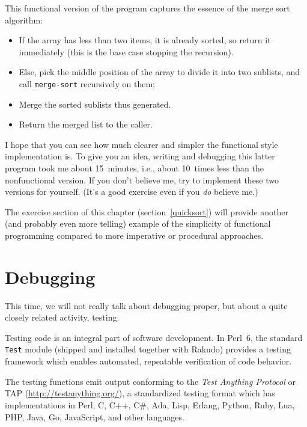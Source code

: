 This functional version of the program captures  
the essence of the merge sort algorithm:
\begin{itemize}
\item If the  array has less than two items, it is already 
sorted, so return it immediately (this is the base case 
stopping the recursion).
\item Else, pick the middle position of the array to divide 
it into two sublists, and call \verb'merge-sort' recursively 
on them;
\item Merge the sorted sublists thus generated.
\item Return the merged list to the caller.
\end{itemize}

I hope that you can see how much clearer and simpler the 
functional style implementation is. To give you an idea, 
writing and debugging this latter program took me about 
15~minutes, i.e., about 10~times less than the 
nonfunctional version. If you don't believe me, try to 
implement these two versions for yourself. (It's a good 
exercise even if you \emph{do} believe me.)

The exercise section of this chapter (section~\ref{quicksort}) 
will provide another (and probably even more telling) example 
of the simplicity of functional programming compared to more 
imperative or procedural approaches.


\section{Debugging}
\label{test_module}

This time, we will not really talk about debugging proper, 
but about a quite closely related activity, testing.

Testing code is an integral part of software development. In 
Perl~6, the standard {\tt Test} module (shipped and installed 
together with Rakudo) provides a testing framework which enables 
automated, repeatable verification of code behavior.

The testing functions emit output conforming to the \emph{Test 
Anything Protocol} or TAP (\url{http://testanything.org/}), a 
standardized testing format which has implementations in Perl, 
C, C++, C\#, Ada, Lisp, Erlang, Python, Ruby, Lua, PHP, Java, 
Go, JavaScript, and other languages.


